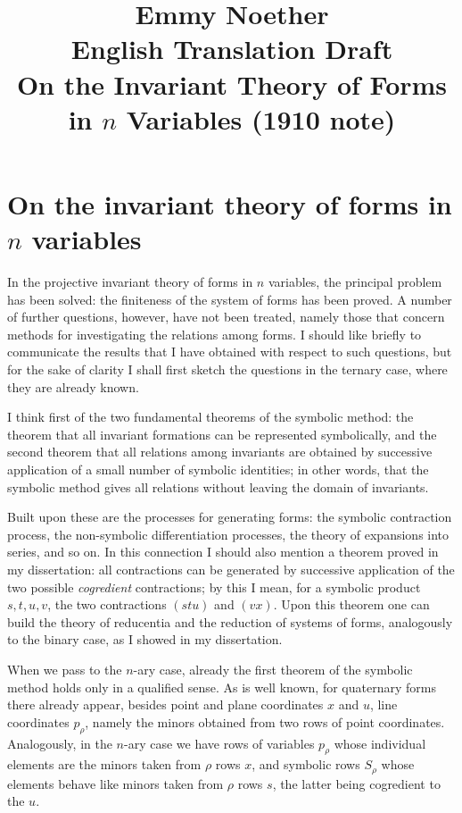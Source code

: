 \documentclass[11pt]{article}
\title{Emmy Noether\\English Translation Draft\\On the Invariant Theory of Forms in $n$ Variables (1910 note)}
\author{}
\date{}
\begin{document}
\maketitle

\section*{On the invariant theory of forms in $n$ variables}

In the projective invariant theory of forms in $n$ variables, the principal problem has been solved: the finiteness of the system of forms has been proved. A number of further questions, however, have not been treated, namely those that concern methods for investigating the relations among forms. I should like briefly to communicate the results that I have obtained with respect to such questions, but for the sake of clarity I shall first sketch the questions in the ternary case, where they are already known.

I think first of the two fundamental theorems of the symbolic method: the theorem that all invariant formations can be represented symbolically, and the second theorem that all relations among invariants are obtained by successive application of a small number of symbolic identities; in other words, that the symbolic method gives all relations without leaving the domain of invariants.

Built upon these are the processes for generating forms: the symbolic contraction process, the non-symbolic differentiation processes, the theory of expansions into series, and so on. In this connection I should also mention a theorem proved in my dissertation: all contractions can be generated by successive application of the two possible \emph{cogredient} contractions; by this I mean, for a symbolic product $s,t,u,v$, the two contractions $(stu)$ and $(vx)$. Upon this theorem one can build the theory of reducentia and the reduction of systems of forms, analogously to the binary case, as I showed in my dissertation.

When we pass to the $n$-ary case, already the first theorem of the symbolic method holds only in a qualified sense. As is well known, for quaternary forms there already appear, besides point and plane coordinates $x$ and $u$, line coordinates $p_\rho$, namely the minors obtained from two rows of point coordinates. Analogously, in the $n$-ary case we have rows of variables $p_\rho$ whose individual elements are the minors taken from $\rho$ rows $x$, and symbolic rows $S_\rho$ whose elements behave like minors taken from $\rho$ rows $s$, the latter being cogredient to the $u$.
\end{document}
